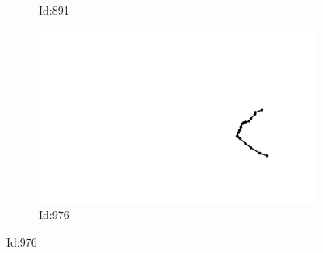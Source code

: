\documentclass[12pt,twoside]{report}
\begin{document}
\begin{figure}
\begin{subfigure}[b]{0.20\textwidth}
\caption{Id:891}
\end{subfigure}
\begin{subfigure}[b]{0.20\textwidth}
\centering
\includegraphics[width=\textwidth]{../../trajectories/976.png}
\caption{Id:976}
\end{subfigure}
\end{figure}
\end{document}
